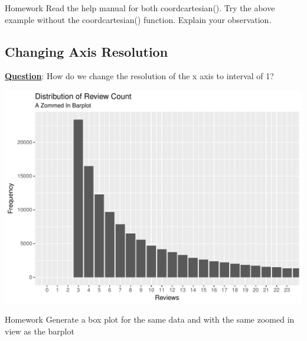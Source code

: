 \documentclass[12pt]{book}\usepackage{knitr}
\begin{document}
\begin{DIY}{Homework}
\noindent Read the help manual for both coord\textunderscore cartesian(). Try the above example without the coord\textunderscore cartesian() function. Explain your observation.
\end{DIY}

\newpage
\subsection{Changing Axis Resolution}
\noindent \textbf{\underline{Question}}: How do we change the resolution of the x axis to interval of 1?
\begin{knitrout}
\color{fgcolor}\begin{kframe}
\begin{alltt}
 \hlkwb{<-}  \hlopt{+}
\hlstd{(}
                    \hlstd{=} \hlstd{(}\hlstd{)}
                  \hlstd{)}  
\end{alltt}
\end{kframe}
\includegraphics[width=\maxwidth]{figure/Change_Axis_Resolution-1} 

\end{knitrout}

\begin{DIY}{Homework}
\noindent Generate a box plot for the same data and with the same zoomed in view as the barplot
\end{DIY}
\end{document}
